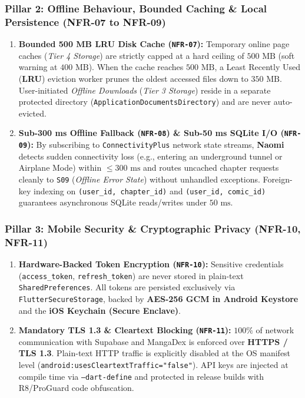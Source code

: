 \subsubsection{Pillar 2: Offline Behaviour, Bounded Caching \& Local Persistence (NFR-07 to NFR-09)}
\begin{enumerate}
    \item \textbf{Bounded 500 MB LRU Disk Cache (\texttt{NFR-07}):} Temporary online page caches (\textit{Tier 4 Storage}) are strictly capped at a hard ceiling of $500\text{ MB}$ (soft warning at $400\text{ MB}$). When the cache reaches $500\text{ MB}$, a Least Recently Used (\textbf{LRU}) eviction worker prunes the oldest accessed files down to $350\text{ MB}$. User-initiated \textit{Offline Downloads} (\textit{Tier 3 Storage}) reside in a separate protected directory (\texttt{ApplicationDocumentsDirectory}) and are never auto-evicted.
    \item \textbf{Sub-300 ms Offline Fallback (\texttt{NFR-08}) \& Sub-50 ms SQLite I/O (\texttt{NFR-09}):} By subscribing to \texttt{ConnectivityPlus} network state streams, \textbf{Naomi} detects sudden connectivity loss (e.g., entering an underground tunnel or Airplane Mode) within $\le 300\text{ ms}$ and routes uncached chapter requests cleanly to \texttt{S09} (\textit{Offline Error State}) without unhandled exceptions. Foreign-key indexing on \texttt{(user\_id, chapter\_id)} and \texttt{(user\_id, comic\_id)} guarantees asynchronous SQLite reads/writes under $50\text{ ms}$.
\end{enumerate}

\subsubsection{Pillar 3: Mobile Security \& Cryptographic Privacy (NFR-10, NFR-11)}
\begin{enumerate}
    \item \textbf{Hardware-Backed Token Encryption (\texttt{NFR-10}):} Sensitive credentials (\texttt{access\_token}, \texttt{refresh\_token}) are never stored in plain-text \texttt{SharedPreferences}. All tokens are persisted exclusively via \texttt{FlutterSecureStorage}, backed by \textbf{AES-256 GCM in Android Keystore} and the \textbf{iOS Keychain (Secure Enclave)}.
    \item \textbf{Mandatory TLS 1.3 \& Cleartext Blocking (\texttt{NFR-11}):} $100\%$ of network communication with Supabase and MangaDex is enforced over \textbf{HTTPS / TLS 1.3}. Plain-text HTTP traffic is explicitly disabled at the OS manifest level (\texttt{android:usesCleartextTraffic="false"}). API keys are injected at compile time via \texttt{--dart-define} and protected in release builds with R8/ProGuard code obfuscation.
\end{enumerate}

